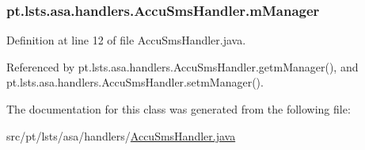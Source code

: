 \hypertarget{classpt_1_1lsts_1_1asa_1_1handlers_1_1AccuSmsHandler_a53314d73ca49397901ad83dc26890767}{}
\subsubsection[{m\+Manager}]{ pt.\+lsts.\+asa.\+handlers.\+Accu\+Sms\+Handler.\+m\+Manager\hspace{0.3cm}{\ttfamily [private]}}\label{classpt_1_1lsts_1_1asa_1_1handlers_1_1AccuSmsHandler_a53314d73ca49397901ad83dc26890767}


Definition at line 12 of file Accu\+Sms\+Handler.\+java.



Referenced by pt.\+lsts.\+asa.\+handlers.\+Accu\+Sms\+Handler.\+getm\+Manager(), and pt.\+lsts.\+asa.\+handlers.\+Accu\+Sms\+Handler.\+setm\+Manager().



The documentation for this class was generated from the following file\+:\begin{DoxyCompactItemize}
\item 
src/pt/lsts/asa/handlers/\hyperlink{AccuSmsHandler_8java}{Accu\+Sms\+Handler.\+java}\end{DoxyCompactItemize}
